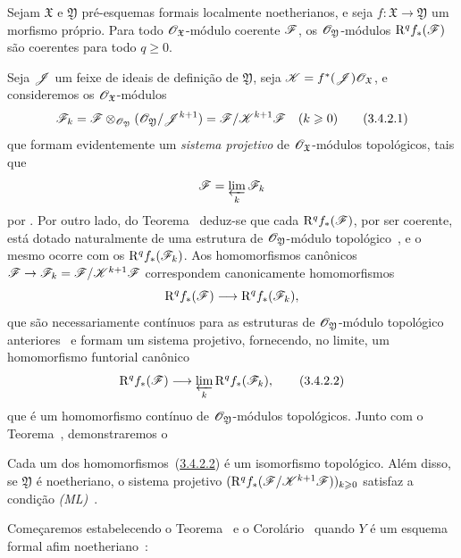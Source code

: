 \begin{theorem}[3.4.2]
\label{III.3.4.2}
Sejam $\mathfrak{X}$ e $\mathfrak{Y}$ pré-esquemas formais localmente noetherianos, e seja $f:\mathfrak{X}\to\mathfrak{Y}$ um morfismo próprio.
Para todo $\mathscr{O}_\mathfrak{X}$-módulo coerente $\mathscr{F}$, os $\mathscr{O}_\mathfrak{Y}$-módulos $\mathrm{R}^q f_*(\mathscr{F})$ são coerentes para todo $q\geq 0$.
\end{theorem}

Seja $\mathscr{J}$ um feixe de ideais de definição de $\mathfrak{Y}$, seja $\mathscr{K}=f^*(\mathscr{J})\mathscr{O}_\mathfrak{X}$, e consideremos os $\mathscr{O}_\mathfrak{X}$-módulos
\[
\label{III.3.4.2.1}
  \sh{F}_k=\sh{F}\otimes_{\sh{O}_\mathfrak{Y}}(\sh{O}_\mathfrak{Y}/\sh{J}^{k+1})=\sh{F}/\sh{K}^{k+1}\sh{F}\quad(k\geq 0)
  \tag{3.4.2.1}
\]
que formam evidentemente um \emph{sistema projetivo} de $\mathscr{O}_\mathfrak{X}$-módulos topológicos, tais que
\[
  \mathscr{F}=\varprojlim_k\mathscr{F}_k
\]
por .
Por outro lado, do Teorema~ deduz-se que cada $\mathrm{R}^q f_*(\mathscr{F})$, por ser coerente, está dotado naturalmente de uma estrutura de $\mathscr{O}_\mathfrak{Y}$-módulo topológico~, e o mesmo ocorre com os $\mathrm{R}^q f_*(\mathscr{F}_k)$.
Aos homomorfismos canônicos $\sh{F}\to\sh{F}_k=\sh{F}/\sh{K}^{k+1}\sh{F}$ correspondem canonicamente homomorfismos
\[
  \RR^q f_*(\sh{F})\to\RR^q f_*(\sh{F}_k),
\]
que são necessariamente contínuos para as estruturas de $\mathscr{O}_\mathfrak{Y}$-módulo topológico anteriores~ e formam um sistema projetivo, fornecendo, no limite, um homomorfismo funtorial canônico
\[
\label{III.3.4.2.2}
  \RR^q f_*(\sh{F})\to\varprojlim_k\RR^q f_*(\sh{F}_k),
  \tag{3.4.2.2}
\]
que é um homomorfismo contínuo de $\mathscr{O}_\mathfrak{Y}$-módulos topológicos.
Junto com o Teorema~, demonstraremos o
\begin{corollary}[3.4.3]
\label{III.3.4.3}
Cada um dos homomorfismos~(\hyperref[III.3.4.2.2]{3.4.2.2}) é um isomorfismo topológico.
Além disso, se $\mathfrak{Y}$ é noetheriano, o sistema projetivo $(\mathrm{R}^q f_*(\mathscr{F}/\mathscr{K}^{k+1}\mathscr{F}))_{k\geqslant 0}$ satisfaz a condição \emph{(ML)}~.
\end{corollary}
Começaremos estabelecendo o Teorema~ e o Corolário~ quando $Y$ é um esquema formal afim noetheriano~:
